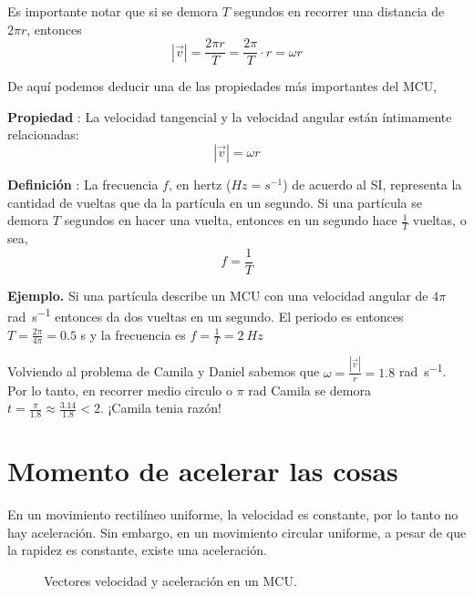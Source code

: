 \documentclass[letterpaper]{article}
\newcommand{\tpa}[1]{node[midway, above, sloped] {#1}}
\newcommand{\tveca}[3]{[->, thick] #1 -- #2 \tpa{#3}}
\newcounter{propiedades}
\newcounter{definiciones}
\newcommand{\propi}{\stepcounter{propiedades} \textbf{Propiedad \thepropiedades}: }
\newcommand{\defii}{\stepcounter{definiciones} \textbf{Definición \thedefiniciones}: }
\newenvironment{prop}
{ \begin{framed} \propi}
{ \end{framed} }
\newenvironment{defi}{\begin{framed} \defii}{\end{framed}}
\begin{document}
Es importante notar que si se demora $T$ segundos en recorrer una distancia de $2\pi r$, entonces $$|\vec{v}| = \frac{2\pi r}{T} = \frac{2\pi}{T} \cdot r = \omega r$$

De aquí podemos deducir una de las propiedades más importantes del MCU,

\begin{prop}
La velocidad tangencial y la velocidad angular están íntimamente relacionadas: $$|\vec{v}| = \omega r$$
\end{prop}

\begin{defi}
 La frecuencia $f$, en hertz ($\si{Hz} = \si{s^{-1}}$) de acuerdo al SI, representa la cantidad de vueltas que da la partícula en un segundo. Si una partícula se demora $T$ segundos en hacer una vuelta, entonces en un segundo hace $\frac{1}{T}$ vueltas, o sea, $$f = \frac{1}{T}$$
 \end{defi} 

\textbf{Ejemplo.} Si una partícula describe un MCU con una velocidad angular de $4\pi$ \si{rad.s^{-1}} entonces da dos vueltas en un segundo. El periodo es entonces $T = \frac{2\pi}{4\pi} = 0.5$ \si{s} y la frecuencia es $f = \frac{1}{T} = 2\ \si{Hz}$  

\vspace{1cm}

Volviendo al problema de Camila y Daniel sabemos que $\omega = \frac{|\vec{v}|}{r} = 1.8$ \si{rad.s^{-1}}. Por lo tanto, en recorrer medio circulo o $\pi$ \si{rad} Camila se demora $t = \frac{\pi}{1.8} \approx \frac{3.14}{1.8} < 2$. ¡Camila tenia razón! 

\section*{Momento de acelerar las cosas}

En un movimiento rectilíneo uniforme, la velocidad es constante, por lo tanto no hay aceleración. Sin embargo, en un movimiento circular uniforme, a pesar de que la rapidez es constante, existe una aceleración.

\begin{figure}[h]
\centering
{}
\caption{Vectores velocidad y aceleración en un MCU.}
\end{figure}
\end{document}
